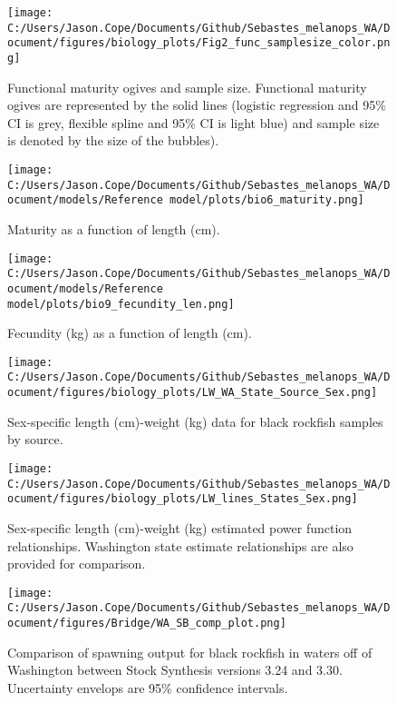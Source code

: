 \documentclass[11pt,
  english,
  letterpaper,
]{article}
\begin{document}
\begin{figure}
\centering
\texttt{[image: C:/Users/Jason.Cope/Documents/Github/Sebastes\_melanops\_WA/Document/figures/biology\_plots/Fig2\_func\_samplesize\_color.png]}
\caption{Functional maturity ogives and sample size. Functional maturity ogives are represented by the solid lines (logistic regression and 95\% CI is grey, flexible spline and 95\% CI is light blue) and sample size is denoted by the size of the bubbles).\label{fig:fxn-spline-mat-color}}
\end{figure}

\begin{figure}
\centering
\texttt{[image: C:/Users/Jason.Cope/Documents/Github/Sebastes\_melanops\_WA/Document/models/Reference model/plots/bio6\_maturity.png]}
\caption{Maturity as a function of length (cm).\label{fig:maturity}}
\end{figure}

\begin{figure}
\centering
\texttt{[image: C:/Users/Jason.Cope/Documents/Github/Sebastes\_melanops\_WA/Document/models/Reference model/plots/bio9\_fecundity\_len.png]}
\caption{Fecundity (kg) as a function of length (cm).\label{fig:fecundity}}
\end{figure}

\begin{figure}
\centering
\texttt{[image: C:/Users/Jason.Cope/Documents/Github/Sebastes\_melanops\_WA/Document/figures/biology\_plots/LW\_WA\_State\_Source\_Sex.png]}
\caption{Sex-specific length (cm)-weight (kg) data for black rockfish samples by source.\label{fig:len-weight-data}}
\end{figure}

\begin{figure}
\centering
\texttt{[image: C:/Users/Jason.Cope/Documents/Github/Sebastes\_melanops\_WA/Document/figures/biology\_plots/LW\_lines\_States\_Sex.png]}
\caption{Sex-specific length (cm)-weight (kg) estimated power function relationships. Washington state estimate relationships are also provided for comparison.\label{fig:len-weight-or-wa}}
\end{figure}

\clearpage

\begin{figure}
\centering
\texttt{[image: C:/Users/Jason.Cope/Documents/Github/Sebastes\_melanops\_WA/Document/figures/Bridge/WA\_SB\_comp\_plot.png]}
\caption{Comparison of spawning output for black rockfish in waters off of Washington between Stock Synthesis versions 3.24 and 3.30. Uncertainty envelops are 95\% confidence intervals.\label{fig:ssb_bridge_comps}}
\end{figure}
\end{document}
